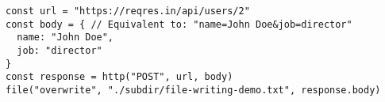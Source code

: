 \vspace{-2.25em}
\begin{center}
\begin{minipage}[t]{1\textwidth}
\begin{listing}[H]
\begin{spacing}{0.6}
\begin{verbatim}
const url = "https://reqres.in/api/users/2"
const body = { // Equivalent to: "name=John Doe&job=director"
  name: "John Doe",
  job: "director"
}
const response = http("POST", url, body)
file("overwrite", "./subdir/file-writing-demo.txt", response.body)
\end{verbatim}
\end{spacing}
\end{listing}
\end{minipage}
\end{center}
